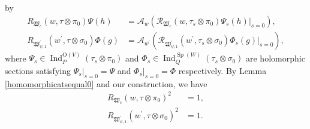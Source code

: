 \documentclass[article]{article}
\numberwithin{equation}{section}
\theoremstyle{definition}
\DeclareMathOperator{\Ind}{Ind}
\DeclareMathOperator{\SP}{Sp}
\begin{document}
by 
\begin{equation}\label{100}
\begin{aligned} 
R_{\mathfrak W_{c}}(w, \tau \otimes \pi_0) \Psi(h) &=\mathcal{A}_{w}\left(\mathcal{R}_{\mathfrak W_{c}}(w, \tau_s \otimes \pi_0) \Psi_s(h)|_{s=0}\right),\\ 
R_{\mathfrak W^\prime_{\psi,1}}(w^{\prime}, \tau \otimes \sigma_0) \Phi(g) &=\mathcal{A}_{w^{\prime}}\left(\mathcal{R}_{\mathfrak W^\prime_{\psi,1}}(w^{\prime}, \tau_s \otimes \sigma_0 ) \Phi_s(g)|_{s=0}\right),
\end{aligned}
\end{equation}
where $\Psi_s\in \Ind_{P}^{\mathrm{O}(V)}\left(\tau_s\otimes \pi_0\right)$ and $\Phi_s\in \Ind_{Q}^{\SP(W)}\left(\tau_s\otimes \sigma_0\right)$ are holomorphic sections satisfying $\Psi_s|_{s=0}=\Psi$ and $\Phi_s|_{s=0}=\Phi$ respectively. By Lemma \ref{homomorphicatsequal0} and our construction, we have  
\begin{equation}\label{twiceequalone}
\begin{aligned}
R_{\mathfrak W_{c}}(w, \tau \otimes \pi_0)^2&=1,\\
R_{\mathfrak W^\prime_{\psi,1}}(w^{\prime}, \tau \otimes \sigma_0)^2&=1.
\end{aligned}
\end{equation}
\end{document}

